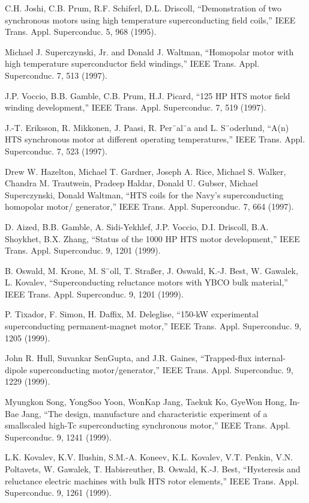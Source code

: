 \noindent [9.207] C.H. Joshi, C.B. Prum, R.F. Schiferl, D.L. Driscoll, ``Demonstration of two
synchronous motors using high temperature superconducting field coils,” IEEE
Trans. Appl. Superconduc. 5, 968 (1995).

\noindent [9.208] Michael J. Superczynski, Jr. and Donald J. Waltman, ``Homopolar motor with
high temperature superconductor field windings,” IEEE Trans. Appl. Superconduc.
7, 513 (1997).

\noindent [9.209] J.P. Voccio, B.B. Gamble, C.B. Prum, H.J. Picard, ``125 HP HTS motor field
winding development,” IEEE Trans. Appl. Superconduc. 7, 519 (1997).

\noindent [9.210] J.-T. Eriksson, R. Mikkonen, J. Paasi, R. Per¨al¨a and L. S¨oderlund, ``A(n) HTS
synchronous motor at different operating temperatures,” IEEE Trans. Appl. Superconduc.
7, 523 (1997).

\noindent [9.211] Drew W. Hazelton, Michael T. Gardner, Joseph A. Rice, Michael S. Walker,
Chandra M. Trautwein, Pradeep Haldar, Donald U. Gubser, Michael Superczynski,
Donald Waltman, ``HTS coils for the Navy’s superconducting homopolar motor/
generator,” IEEE Trans. Appl. Superconduc. 7, 664 (1997).

\noindent [9.212] D. Aized, B.B. Gamble, A. Sidi-Yekhlef, J.P. Voccio, D.I. Driscoll, B.A. Shoykhet,
B.X. Zhang, ``Status of the 1000 HP HTS motor development,” IEEE Trans. Appl.
Superconduc. 9, 1201 (1999).

\noindent [9.213] B. Oswald, M. Krone, M. S¨oll, T. Straßer, J. Oswald, K.-J. Best, W. Gawalek, L.
Kovalev, ``Superconducting reluctance motors with YBCO bulk material,” IEEE
Trans. Appl. Superconduc. 9, 1201 (1999).

\noindent [9.214] P. Tixador, F. Simon, H. Daffix, M. Deleglise, ``150-kW experimental superconducting
permanent-magnet motor,” IEEE Trans. Appl. Superconduc. 9, 1205 (1999).

\noindent [9.215] John R. Hull, Suvankar SenGupta, and J.R. Gaines, ``Trapped-flux internal-dipole
superconducting motor/generator,” IEEE Trans. Appl. Superconduc. 9, 1229
(1999).

\noindent [9.216] Myungkon Song, YongSoo Yoon, WonKap Jang, Taekuk Ko, GyeWon Hong, In-
Bae Jang, ``The design, manufacture and characteristic experiment of a smallscaled
high-Tc superconducting synchronous motor,” IEEE Trans. Appl. Superconduc. 9, 1241 (1999).

\noindent [9.217] L.K. Kovalev, K.V. Ilushin, S.M.-A. Koneev, K.L. Kovalev, V.T. Penkin, V.N.
Poltavets, W. Gawalek, T. Habisreuther, B. Oswald, K.-J. Best, ``Hysteresis and
reluctance electric machines with bulk HTS rotor elements,” IEEE Trans. Appl.
Superconduc. 9, 1261 (1999).

